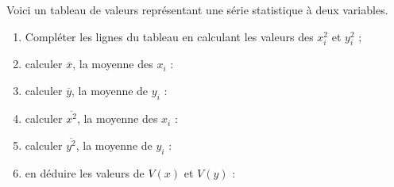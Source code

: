 \documentclass[11pt]{article}
\begin{document}
\phm
\vspace{-1cm}

\begin{exercice}[1][Variance]
Voici un tableau de valeurs représentant une série statistique à deux variables.

\begin{center}

\end{center}

\begin{enumerate}
\item Compléter les lignes du tableau en calculant les valeurs
des $x_i^2$ et $y_i^2$ ;
\item calculer $\overline{x}$, la moyenne des $x_i$ : \dotfill \\ \dtf
\item calculer $\overline{y}$, la moyenne de $y_i$ : \dotfill  \\ \dtf
\item calculer $\overline{x^2}$, la moyenne des $x_i$ : \dotfill \\ \dtf
\item calculer $\overline{y^2}$, la moyenne de $y_i$ : \dotfill  \\ \dtf
\item en déduire les valeurs de $V(x)$ et $V(y)$ :
\dotfill \\ \dtf
\end{enumerate}
\end{exercice}
\end{document}
